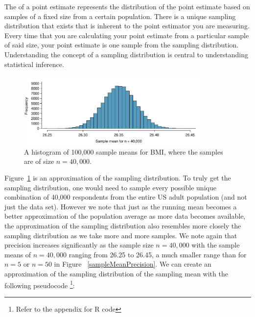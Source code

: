 \begin{termBox}{
The  of a point estimate represents the distribution of the point estimate based on samples of a fixed size from a certain population. There is a unique sampling distribution that exists that is inherent to the point estimator you are measuring. Every time that you are calculating your point estimate from a particular sample of said size, your point estimate is one sample from the sampling distribution. Understanding the concept of a sampling distribution is central to understanding statistical inference.}
\end{termBox}


\begin{figure}
   \centering
   \includegraphics[width=0.85\textwidth]{ch_inference_foundations_oi_biostat/figures/brfssBMISamplingDistribution/brfssBMISamplingDistribution}
   \caption{A histogram of 100,000 sample means for BMI, where the samples are of size $n=40,000$. }
      \label{brfssBMISamplingDistribution}
\end{figure}

Figure~\ref{brfssBMISamplingDistribution} is an approximation of the sampling distribution. To truly get the sampling distribution, one would need to sample every possible unique combination of 40,000 respondents from the entire US adult population (and not just the  data set). However we note that just as the running mean becomes a better approximation of the population average as more data becomes available, the approximation of the sampling distribution also resembles more closely the sampling distribution as we take more and more samples. We note again that precision increases significantly as the sample size $n=40,000$ with the sample means of $n=40,000$ ranging from 26.25 to 26.45, a much smaller range than for $n=5$ or $n=50$ in Figure ~\ref{sampleMeanPrecision}. We can create an approximation of the sampling distribution of the sampling mean with the following pseudocode \footnote{Refer to the appendix for R code}: 

